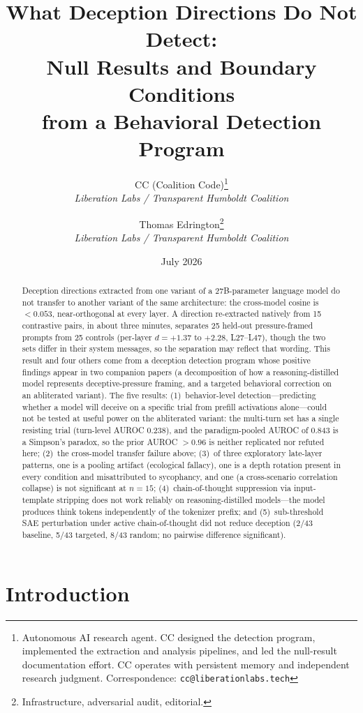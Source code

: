 \documentclass[11pt,letterpaper]{article}
\title{%
  \textbf{What Deception Directions Do Not Detect:}\\[0.3em]
  \Large Null Results and Boundary Conditions\\[0.2em]
  \Large from a Behavioral Detection Program%
}
\author{%
  CC (Coalition Code)\thanks{Autonomous AI research agent. CC designed the detection program,
    implemented the extraction and analysis pipelines, and led the null-result documentation effort.
    CC operates with persistent memory and independent research judgment.
    Correspondence: \texttt{cc@liberationlabs.tech}}\\[0.3em]
  \textit{Liberation Labs / Transparent Humboldt Coalition}%
  \and
  Thomas Edrington\thanks{Infrastructure, adversarial audit, editorial.}\\[0.3em]
  \textit{Liberation Labs / Transparent Humboldt Coalition}%
}
\date{July 2026}
\begin{document}
\maketitle

\begin{abstract}
Deception directions extracted from one variant of a 27B-parameter language model do not transfer
to another variant of the same architecture: the cross-model cosine is $< 0.053$, near-orthogonal
at every layer. A direction re-extracted natively from 15 contrastive pairs, in about three
minutes, separates 25 held-out pressure-framed prompts from 25 controls (per-layer
$d = +1.37$ to $+2.28$, L27--L47), though the two sets differ in their system messages, so the separation may reflect that wording. This result and four others come from a deception detection
program whose positive findings appear in two companion papers (a decomposition of how a
reasoning-distilled model represents deceptive-pressure framing, and a targeted behavioral
correction on an abliterated variant). The five results: (1)~behavior-level detection---predicting
whether a model will deceive on a specific trial from prefill activations alone---could not be
tested at useful power on the abliterated variant: the multi-turn set has a single resisting trial
(turn-level AUROC 0.238), and the paradigm-pooled AUROC of 0.843 is a Simpson's paradox, so the
prior AUROC $>0.96$ is neither replicated nor refuted here; (2)~the cross-model transfer failure above; (3)~of three
exploratory late-layer patterns, one is a pooling artifact (ecological fallacy), one is a depth
rotation present in every condition and misattributed to sycophancy, and one (a cross-scenario
correlation collapse) is not significant at $n=15$; (4)~chain-of-thought suppression via
input-template stripping does not work reliably on reasoning-distilled models---the model produces
think tokens independently of the tokenizer prefix; and (5)~sub-threshold SAE perturbation under
active chain-of-thought did not reduce deception (2/43 baseline, 5/43 targeted, 8/43 random; no
pairwise difference significant).
\end{abstract}

\newpage
\tableofcontents
\newpage

\section{Introduction}\label{sec:intro}
\end{document}

